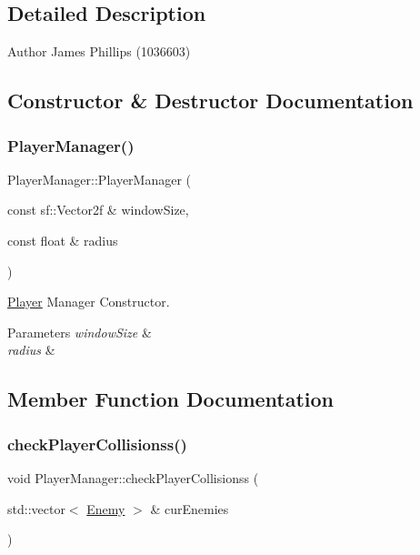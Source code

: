 \subsection{Detailed Description}
\begin{DoxyAuthor}{Author}
James Phillips (1036603) 
\end{DoxyAuthor}


\subsection{Constructor \& Destructor Documentation}
\mbox{\label{class_player_manager_aa2ce60af19b9d80bd884e2edaea726d6}} 
\subsubsection{\texorpdfstring{Player\+Manager()}{PlayerManager()}}
{\footnotesize\ttfamily Player\+Manager\+::\+Player\+Manager (\begin{DoxyParamCaption}\item[{const sf\+::\+Vector2f \&}]{window\+Size,  }\item[{const float \&}]{radius }\end{DoxyParamCaption})}



\hyperlink{class_player}{Player} Manager Constructor. 


\begin{DoxyParams}{Parameters}
{\em window\+Size} & \\
\hline
{\em radius} & \\
\hline
\end{DoxyParams}


\subsection{Member Function Documentation}
\mbox{\label{class_player_manager_ac4bad97c7d281a47a876d7cee5f864bd}} 
\subsubsection{\texorpdfstring{check\+Player\+Collisionss()}{checkPlayerCollisionss()}}
{\footnotesize\ttfamily void Player\+Manager\+::check\+Player\+Collisionss (\begin{DoxyParamCaption}\item[{std\+::vector$<$ \hyperlink{class_enemy}{Enemy} $>$ \&}]{cur\+Enemies }\end{DoxyParamCaption})}



